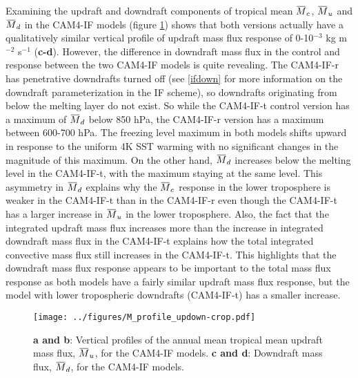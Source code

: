 \documentclass[letterpaper,12pt,titlepage,oneside,final]{book}
\newcommand{\overbar}[1]{\mkern 1.5mu\overline{\mkern-1.5mu#1\mkern-1.5mu}\mkern 1.5mu}
\begin{document}
Examining the updraft and downdraft components of tropical mean $\overbar{M}_{c}$, $\overbar{M}_{u}$ and $\overbar{M}_{d}$  in the CAM4-IF models (figure \ref{fig:updown}) shows that both versions actually have a qualitatively similar vertical profile of updraft mass flux response of 0-10$^{-3}$ kg m$^{-2}$ s$^{-1}$ (\textbf{c-d}). However, the difference in downdraft mass flux in the control and response between the two CAM4-IF models is quite revealing. The CAM4-IF-r has penetrative downdrafts turned off (see \ref{ifdown} for more information on the downdraft parameterization in the IF scheme), so downdrafts originating from below the melting layer do not exist. So while the CAM4-IF-t control version has a maximum of $\overbar{M}_{d}$ below 850 hPa, the CAM4-IF-r version has a maximum between 600-700 hPa. The freezing level maximum in both models shifts upward in response to the uniform 4K SST warming with no significant changes in the magnitude of this maximum. On the other hand, $\overbar{M}_{d}$  increases below the melting level in the CAM4-IF-t, with the maximum staying at the same level. This asymmetry in $\overbar{M}_{d}$ explains why the $\overbar{M}_{c}$ response in the lower troposphere is weaker in the CAM4-IF-t than in the CAM4-IF-r even though the CAM4-IF-t has a larger increase in $\overbar{M}_{u}$ in the lower troposphere. Also, the fact that the integrated updraft mass flux increases more than the increase in integrated downdraft mass flux in the CAM4-IF-t explains how the total integrated convective mass flux still increases in the CAM4-IF-t. This highlights that the downdraft mass flux response appears to be important to the total mass flux response as both models have a fairly similar updraft mass flux response, but the model with lower tropospheric downdrafts (CAM4-IF-t) has a smaller increase.
\begin{figure}[H]
\centering
\noindent\texttt{[image: ../figures/M\_profile\_updown-crop.pdf]}\hfill
\caption{\footnotesize \footnotesize  \textbf{a and b}: Vertical profiles of the annual mean tropical mean updraft mass flux, $\overbar{M}_{u}$, for the CAM4-IF models. \textbf{c and d}: Downdraft mass flux, $\overbar{M}_{d}$, for the CAM4-IF models.}
\label{fig:updown}
\end{figure}
\end{document}
